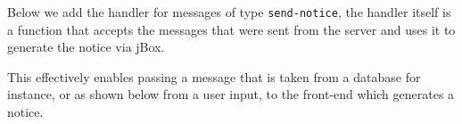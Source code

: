 \documentclass[
]{krantz}
\makeatletter
\newenvironment{Shaded}{\begin{snugshade}}{\end{snugshade}}
\newcommand{\KeywordTok}[1]{\textcolor[rgb]{0.27,0.27,0.27}{\textbf{#1}}}
\newcommand{\NormalTok}[1]{#1}
\newcommand{\OperatorTok}[1]{\textcolor[rgb]{0.43,0.43,0.43}{\textbf{#1}}}
\newcommand{\StringTok}[1]{\textcolor[rgb]{0.5,0.5,0.5}{#1}}
\newenvironment{kframe}{%
\medskip{}
\setlength{\fboxsep}{.8em}
 \def\at@end@of@kframe{}%
 \ifinner\ifhmode%
  \def\at@end@of@kframe{\end{minipage}}%
  \begin{minipage}{\columnwidth}%
 \fi\fi%
 \def\FrameCommand##1{\hskip\@totalleftmargin \hskip-\fboxsep
 \colorbox{shadecolor}{##1}\hskip-\fboxsep
     \hskip-\linewidth \hskip-\@totalleftmargin \hskip\columnwidth}%
 \MakeFramed {\advance\hsize-\width
   \@totalleftmargin\z@ \linewidth\hsize
   \@setminipage}}%
 {\par\unskip\endMakeFramed%
 \at@end@of@kframe}
\renewenvironment{Shaded}{\begin{kframe}}{\end{kframe}}
\makeatother
\begin{document}
Below we add the handler for messages of type \texttt{send-notice}, the handler itself is a function that accepts the messages that were sent from the server and uses it to generate the notice via jBox.

\begin{Shaded}
\end{Shaded}

This effectively enables passing a message that is taken from a database for instance, or as shown below from a user input, to the front-end which generates a notice.
\end{document}
